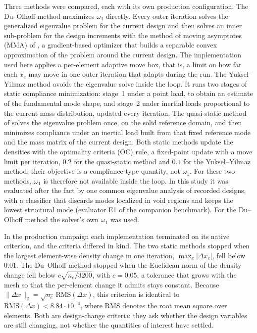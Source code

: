 \documentclass[11pt,a4paper]{article}
\newcommand{\dx}{\Delta x}
\newcommand{\maxdx}{\max_e|\Delta x_e|}
\newcommand{\RMS}{\mathrm{RMS}}
\begin{document}
Three methods were compared, each with its own production configuration. The Du--Olhoff method \citep{Du2007,Olhoff2014} maximizes $\omega_1$ directly. Every outer iteration solves the generalized eigenvalue problem for the current design and then solves an inner sub-problem for the design increments with the method of moving asymptotes (MMA) of \citet{Svanberg1987}, a gradient-based optimizer that builds a separable convex approximation of the problem around the current design. The implementation used here applies a per-element adaptive move box, that is, a limit on how far each $x_e$ may move in one outer iteration that adapts during the run. The Yuksel--Yilmaz method \citep{Yuksel2025} avoids the eigenvalue solve inside the loop. It runs two stages of static compliance minimization: stage~1 under a point load, to obtain an estimate of the fundamental mode shape, and stage~2 under inertial loads proportional to the current mass distribution, updated every iteration. The quasi-static method of \citet{Tauzowski2026} solves the eigenvalue problem once, on the solid reference domain, and then minimizes compliance under an inertial load built from that fixed reference mode and the mass matrix of the current design. Both static methods update the densities with the optimality criteria (OC) rule, a fixed-point update with a move limit per iteration, $0.2$ for the quasi-static method and $0.1$ for the Yuksel--Yilmaz method; their objective is a compliance-type quantity, not $\omega_1$. For these two methods, $\omega_1$ is therefore not available inside the loop. In this study it was evaluated after the fact by one common eigenvalue analysis of recorded designs, with a classifier that discards modes localized in void regions and keeps the lowest structural mode (evaluator E1 of the companion benchmark). For the Du--Olhoff method the solver's own $\omega_1$ was used.

In the production campaign each implementation terminated on its native criterion, and the criteria differed in kind. The two static methods stopped when the largest element-wise density change in one iteration, $\maxdx$, fell below $0.01$. The Du--Olhoff method stopped when the Euclidean norm of the density change fell below $c\sqrt{n_e/3200}$, with $c = 0.05$, a tolerance that grows with the mesh so that the per-element change it admits stays constant. Because $\|\dx\|_2 = \sqrt{n_e}\,\RMS(\dx)$, this criterion is identical to $\RMS(\dx) < 8.84\cdot10^{-4}$, where $\RMS$ denotes the root mean square over elements. Both are design-change criteria: they ask whether the design variables are still changing, not whether the quantities of interest have settled.
\end{document}
